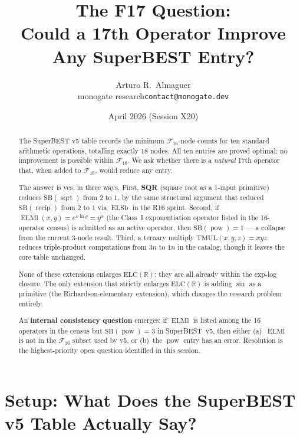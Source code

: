 \documentclass[12pt,a4paper]{article}
\title{The F17 Question:\\[4pt]
       Could a 17th Operator Improve Any SuperBEST Entry?}
\author{Arturo R.\ Almaguer\\
  \small monogate research\quad\texttt{contact@monogate.dev}}
\date{April 2026 (Session X20)}
\theoremstyle{definition}
\theoremstyle{remark}
\newcommand{\ELSb}{\operatorname{ELSb}}
\newcommand{\ELMl}{\operatorname{ELMl}}
\newcommand{\recip}{\operatorname{recip}}
\newcommand{\powop}{\operatorname{pow}}
\newcommand{\sqrtop}{\operatorname{sqrt}}
\newcommand{\SB}{\mathrm{SB}}
\newcommand{\F}{\mathcal{F}_{16}}
\newcommand{\ELC}{\mathrm{ELC}(\mathbb{R})}
\begin{document}
\maketitle

\begin{abstract}
The SuperBEST v5 table records the minimum $\mathcal{F}_{16}$-node counts
for ten standard arithmetic operations, totalling exactly 18 nodes.
All ten entries are proved optimal: no improvement is possible within $\F$.
We ask whether there is a \emph{natural} 17th operator that, when added to
$\F$, would reduce any entry.

The answer is yes, in three ways.
First, \textbf{SQR} (square root as a 1-input primitive) reduces
$\SB(\sqrtop)$ from $2$ to $1$, by the same structural argument that
reduced $\SB(\recip)$ from $2$ to $1$ via $\ELSb$ in the R16 sprint.
Second, if $\ELMl(x,y) = e^{x\ln y} = y^x$ (the Class~I exponentiation
operator listed in the 16-operator census) is admitted as an active
operator, then $\SB(\powop) = 1$ --- a collapse from the current
3-node result.
Third, a ternary multiply $\mathrm{TMUL}(x,y,z)=xyz$ reduces
triple-product computations from $3n$ to $1n$ in the catalog,
though it leaves the core table unchanged.

None of these extensions enlarges $\ELC$: they are all already within the
exp-log closure.  The only extension that strictly enlarges $\ELC$ is adding
$\sin$ as a primitive (the Richardson-elementary extension), which changes the
research problem entirely.

An \textbf{internal consistency question} emerges: if $\ELMl$ is
listed among the 16 operators in the census but $\SB(\powop)=3$ in
SuperBEST~v5, then either (a)~$\ELMl$ is not in the $\F$ subset used
by v5, or (b)~the $\powop$ entry has an error.
Resolution is the highest-priority open question identified in this session.
\end{abstract}

\tableofcontents

\section{Setup: What Does the SuperBEST v5 Table Actually Say?}
\label{sec:setup}
\end{document}

